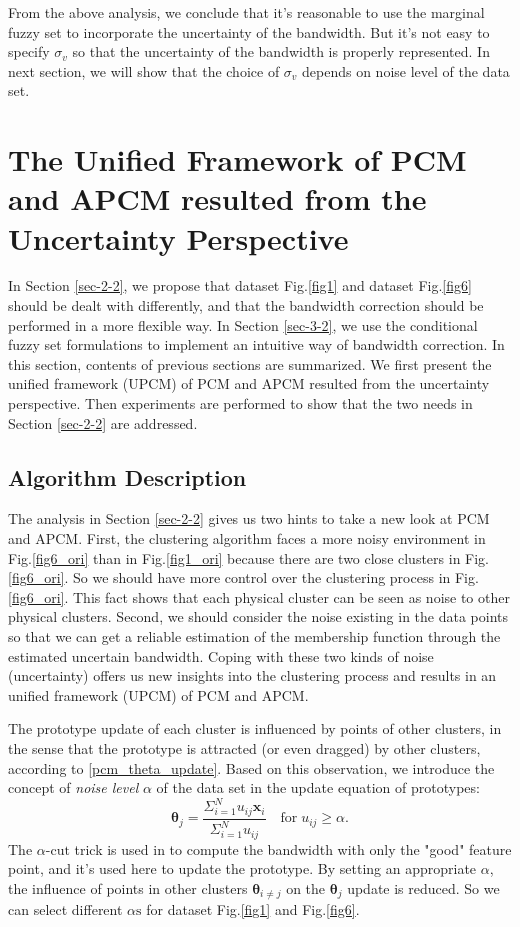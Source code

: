 \documentclass[journal,transmag]{IEEEtran}
\begin{document}
From the above analysis, we conclude that it's reasonable to use the marginal fuzzy set to incorporate the uncertainty of the bandwidth. But it's not easy to specify $\sigma_v$ so that the uncertainty of the bandwidth is properly represented. In next section, we will show that the choice of $\sigma_v$ depends on noise level of the data set.
\section{The Unified Framework of PCM and APCM resulted from the Uncertainty Perspective}
\label{sec-4}
In Section \ref{sec-2-2}, we propose that dataset Fig.\ref{fig1} and dataset Fig.\ref{fig6} should be dealt with differently, and that the bandwidth correction should be performed in a more flexible way. In Section \ref{sec-3-2}, we use the conditional fuzzy set formulations to implement an intuitive way of bandwidth correction. In this section, contents of previous sections are summarized. We first present the unified framework (UPCM) of PCM and APCM resulted from the uncertainty perspective. Then experiments are performed to show that the two needs in Section \ref{sec-2-2} are addressed.
\subsection{Algorithm Description}
\label{sec-4-1}
The analysis in Section \ref{sec-2-2} gives us two hints to take a new look at PCM and APCM.
First, the clustering algorithm faces a more noisy environment in Fig.\ref{fig6_ori} than in Fig.\ref{fig1_ori} because there are two close clusters in Fig.\ref{fig6_ori}. So we should have more control over the clustering process in Fig.\ref{fig6_ori}. This fact shows that each physical cluster can be seen as noise to other physical clusters.
Second, we should consider the noise existing in the data points so that we can get a reliable estimation of the membership function through the estimated uncertain bandwidth.
Coping with these two kinds of noise (uncertainty) offers us new insights into the clustering process and results in an unified framework (UPCM) of PCM and APCM.

The prototype update of each cluster is influenced by points of other clusters, in the sense that the prototype is attracted (or even dragged) by other clusters, according to \eqref{pcm_theta_update}.
Based on this observation, we introduce the concept of \emph{noise level} $\alpha$ of the data set in the update equation of prototypes:
\begin{equation}
\label{upcm_theta_update}
\boldsymbol{\theta}_j=\frac{\Sigma_{i=1}^Nu_{ij}\mathbf{x}_i}{\Sigma_{i=1}^Nu_{ij}} \quad \text{for}\;u_{ij}\geq \alpha.
\end{equation}
The $\alpha\text{-cut}$ trick is used in \cite{krishnapuram_possibilistic_1993} to compute the bandwidth with only the "good" feature point, and it's used here to update the prototype. By setting an appropriate $\alpha$, the influence of points in other clusters $\boldsymbol{\theta}_{i\neq j}$ on the $\boldsymbol{\theta}_j$ update is reduced. So we can select different $\alpha\text{s}$ for dataset Fig.\ref{fig1} and Fig.\ref{fig6}.
\end{document}
